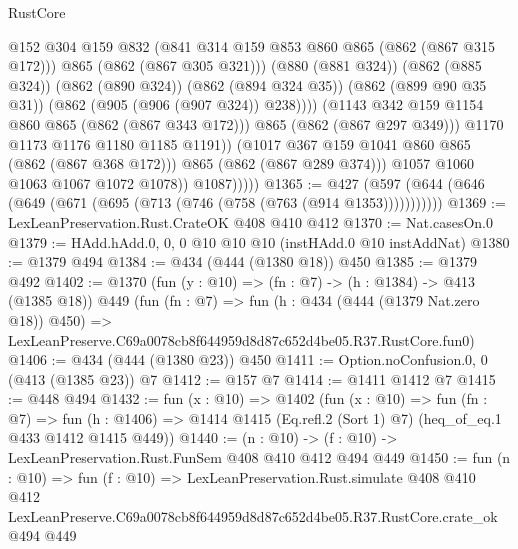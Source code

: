 \begin{lexlean}{RustCore}
\begin{coremodule}
                                @152
                                @304
                                @159
                                @832
                                (@841 @314 @159 @853 @860 @865 (@862 (@867 @315 @172)))
                                @865
                                (@862 (@867 @305 @321)))
                              (@880 (@881 @324))
                              (@862 (@885 @324))
                              (@862 (@890 @324))
                              (@862 (@894 @324 @35))
                              (@862 (@899 @90 @35 @31))
                              (@862 (@905 (@906 (@907 @324)) @238))))
                          (@1143 @342 @159 @1154 @860 @865 (@862 (@867 @343 @172)))
                          @865
                          (@862 (@867 @297 @349)))
                        @1170
                        @1173
                        @1176
                        @1180
                        @1185
                        @1191))
                    (@1017 @367 @159 @1041 @860 @865 (@862 (@867 @368 @172)))
                    @865
                    (@862 (@867 @289 @374)))
                  @1057
                  @1060
                  @1063
                  @1067
                  @1072
                  @1078))
              @1087)))))
@1365 := @427 (@597 (@644 (@646 (@649 (@671 (@695 (@713 (@746 (@758 (@763 (@914 @1353)))))))))))
@1369 := LexLeanPreservation.Rust.CrateOK @408 @410 @412
@1370 := Nat.casesOn.{0}
@1379 := HAdd.hAdd.{0, 0, 0} @10 @10 @10 (instHAdd.{0} @10 instAddNat)
@1380 := @1379 @494
@1384 := @434 (@444 (@1380 @18)) @450
@1385 := @1379 @492
@1402 := @1370
    (fun (y : @10) => (fn : @7) -> (h : @1384) -> @413 (@1385 @18))
    @449
    (fun (fn : @7) =>
    fun (h : @434 (@444 (@1379 Nat.zero @18)) @450) =>
    LexLeanPreserve.C69a0078cb8f644959d8d87c652d4be05.R37.RustCore.fun0)
@1406 := @434 (@444 (@1380 @23)) @450
@1411 := Option.noConfusion.{0, 0} (@413 (@1385 @23)) @7
@1412 := @157 @7
@1414 := @1411 @1412 @7
@1415 := @448 @494
@1432 := fun (x : @10) =>
  @1402
    (fun (x : @10) =>
    fun (fn : @7) =>
    fun (h : @1406) => @1414 @1415 (Eq.refl.{2} (Sort 1) @7) (heq_of_eq.{1} @433 @1412 @1415 @449))
@1440 := (n : @10) -> (f : @10) -> LexLeanPreservation.Rust.FunSem @408 @410 @412 @494 @449
@1450 := fun (n : @10) =>
  fun (f : @10) =>
  LexLeanPreservation.Rust.simulate
    @408
    @410
    @412
    LexLeanPreserve.C69a0078cb8f644959d8d87c652d4be05.R37.RustCore.crate_ok
    @494
    @449
\end{coremodule}
\end{lexlean}
